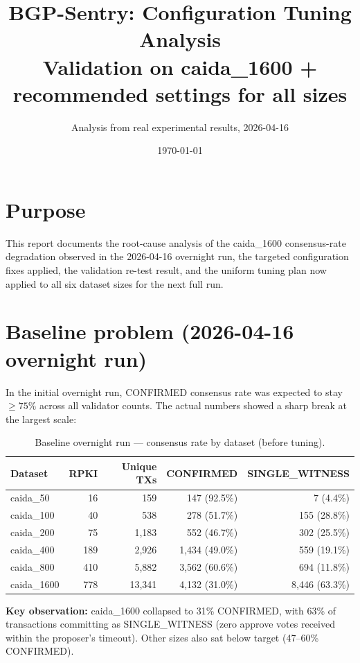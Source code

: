 \documentclass[10pt,a4paper]{article}
\title{\textbf{BGP-Sentry: Configuration Tuning Analysis}\\
\large Validation on caida\_1600 + recommended settings for all sizes}
\author{Analysis from real experimental results, 2026-04-16}
\date{\today}
\begin{document}
\maketitle

\section*{Purpose}

This report documents the root-cause analysis of the caida\_1600
consensus-rate degradation observed in the 2026-04-16 overnight run, the
targeted configuration fixes applied, the validation re-test result, and
the uniform tuning plan now applied to all six dataset sizes for the next
full run.

\section{Baseline problem (2026-04-16 overnight run)}

In the initial overnight run, CONFIRMED consensus rate was expected to
stay $\geq 75\%$ across all validator counts. The actual numbers showed
a sharp break at the largest scale:

\begin{table}[h]
\centering
\caption{Baseline overnight run --- consensus rate by dataset (before tuning).}
\begin{tabular}{lrrrr}
\toprule
Dataset & RPKI & Unique TXs & CONFIRMED & SINGLE\_WITNESS \\
\midrule

caida\_50 & 16 & 159 & 147 (92.5\%) & 7 (4.4\%) \\
caida\_100 & 40 & 538 & 278 (51.7\%) & 155 (28.8\%) \\
caida\_200 & 75 & 1,183 & 552 (46.7\%) & 302 (25.5\%) \\
caida\_400 & 189 & 2,926 & 1,434 (49.0\%) & 559 (19.1\%) \\
caida\_800 & 410 & 5,882 & 3,562 (60.6\%) & 694 (11.8\%) \\
caida\_1600 & 778 & 13,341 & 4,132 (31.0\%) & 8,446 (63.3\%) \\
\bottomrule
\end{tabular}
\end{table}

\textbf{Key observation:} caida\_1600 collapsed to 31\% CONFIRMED, with
63\% of transactions committing as SINGLE\_WITNESS (zero approve votes
received within the proposer's timeout).  Other sizes also sat below
target (47--60\% CONFIRMED).
\end{document}
